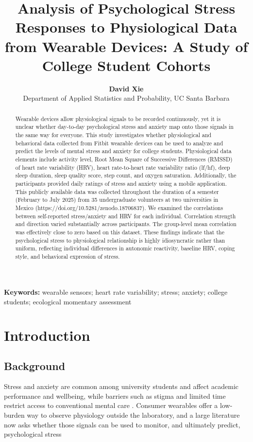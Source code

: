 \documentclass[11pt, a4paper, oneside]{article}
\title{\textbf{Analysis of Psychological Stress Responses to Physiological Data from Wearable Devices: A Study of College Student Cohorts}}
\author{\textbf{David Xie} \\ Department of Applied Statistics and Probability, UC Santa Barbara}
\date{}
\begin{document}
\maketitle %

\begin{abstract}
Wearable devices allow physiological signals to be recorded continuously, yet it is unclear whether day-to-day psychological stress and anxiety map onto those signals in the same way for everyone. This study investigates whether physiological and behavioral data collected from Fitbit wearable devices can be used to analyze and predict the levels of mental stress and anxiety for college students. Physiological data elements include activity level, Root Mean Square of Successive Differences (RMSSD) of heart rate variability (HRV), heart rate-to-heart rate variability ratio (lf/hf), deep sleep duration, sleep quality score, step count, and oxygen saturation. Additionally, the participants provided daily ratings of stress and anxiety using a mobile application. This publicly available data was collected throughout the duration of a semester (February to July 2025) from 35 undergraduate volunteers at two universities in Mexico (https://doi.org/10.5281/zenodo.18706837). We examined the correlations between self-reported stress/anxiety and HRV for each individual. Correlation strength and direction varied substantially across participants. The group-level mean correlation was effectively close to zero based on this dataset. These findings indicate that the psychological stress to physiological relationship is highly idiosyncratic rather than uniform, reflecting individual differences in autonomic reactivity, baseline HRV, coping style, and behavioral expression of stress.
\end{abstract}

\textbf{Keywords:} wearable sensors; heart rate variability; stress; anxiety; college students; ecological momentary assessment

\section{Introduction}

\subsection{Background}
Stress and anxiety are common among university students and affect academic performance and wellbeing, while barriers such as stigma and limited time restrict access to conventional mental care \cite{reference 1}. Consumer wearables offer a low-burden way to observe physiology outside the laboratory, and a large literature now asks whether those signals can be used to monitor, and ultimately predict, psychological stress
\end{document}

